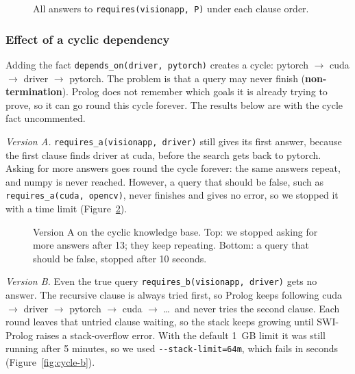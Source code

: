 \documentclass{article}
\begin{document}
\begin{figure}[!htb]
  \begin{minipage}[t]{0.48\linewidth}
  \end{minipage}\hfill
  \begin{minipage}[t]{0.48\linewidth}
  \end{minipage}
  \caption{All answers to \texttt{requires(visionapp, P)} under each clause order.}
  \label{fig:answers-ab}
\end{figure}

\subsubsection{Effect of a cyclic dependency}

Adding the fact \texttt{depends\_on(driver, pytorch)} creates a cycle: pytorch $\rightarrow$ cuda $\rightarrow$ driver $\rightarrow$ pytorch.
The problem is that a query may never finish (\textbf{non-termination}).
Prolog does not remember which goals it is already trying to prove, so it can go round this cycle forever.
The results below are with the cycle fact uncommented.

\emph{Version A.} \texttt{requires\_a(visionapp, driver)} still gives its first answer, because the first clause finds driver at cuda,
before the search gets back to pytorch. Asking for more answers goes round the cycle forever: the same answers repeat, and numpy is never reached.
However, a query that should be false, such as \texttt{requires\_a(cuda, opencv)}, never finishes and gives no error, so we stopped it with a time limit (Figure~\ref{fig:cycle-a}).

\begin{figure}[!htb]
  \caption{Version A on the cyclic knowledge base. Top: we stopped asking for more answers after 13; they keep repeating. Bottom: a query that should be false, stopped after 10 seconds.}
  \label{fig:cycle-a}
\end{figure}

\emph{Version B.} Even the true query \texttt{requires\_b(visionapp, driver)} gets no answer. The recursive clause is always tried first,
so Prolog keeps following cuda $\rightarrow$ driver $\rightarrow$ pytorch $\rightarrow$ cuda $\rightarrow$ \dots\ and never tries the second clause.
Each round leaves that untried clause waiting, so the stack keeps growing until SWI-Prolog raises a stack-overflow error.
With the default 1~GB limit it was still running after 5 minutes, so we used \texttt{-{}-stack-limit=64m}, which fails in seconds (Figure~\ref{fig:cycle-b}).
\end{document}
